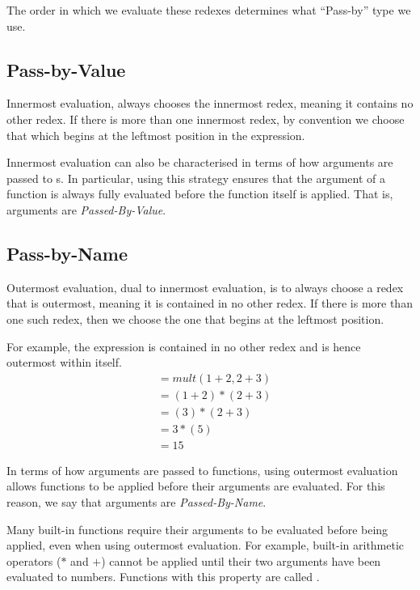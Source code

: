 The order in which we evaluate these redexes determines what ``Pass-by'' type we use.

\subsection{Pass-by-Value}\label{subsec:Pass_by_Value}
Innermost evaluation, always chooses the innermost redex, meaning it contains no other redex.
If there is more than one innermost redex, by convention we choose that which begins at the leftmost position in the expression.

Innermost evaluation can also be characterised in terms of how arguments are passed to s.
In particular, using this strategy ensures that the argument of a function is always fully evaluated before the function itself is applied.
That is, arguments are \emph{Passed-By-Value}.

\subsection{Pass-by-Name}\label{subsec:Pass_by_Name}
Outermost evaluation, dual to innermost evaluation, is to always choose a redex that is outermost, meaning it is contained in no other redex.
If there is more than one such redex, then we choose the one that begins at the leftmost position.

For example, the expression  is contained in no other redex and is hence outermost within itself.
\begin{align*}
  &= mult(1+2, 2+3) \\
  &= (1+2) * (2+3) \\
  &= (3) * (2+3) \\
  &= 3 * (5) \\
  &= 15
\end{align*}

In terms of how arguments are passed to functions, using outermost evaluation allows functions to be applied before their arguments are evaluated.
For this reason, we say that arguments are \emph{Passed-By-Name}.

\begin{remark*}
  Many built-in functions require their arguments to be evaluated before being applied, even when using outermost evaluation.
  For example, built-in arithmetic operators ($*$ and $+$) cannot be applied until their two arguments have been evaluated to numbers.
  Functions with this property are called .
\end{remark*}

